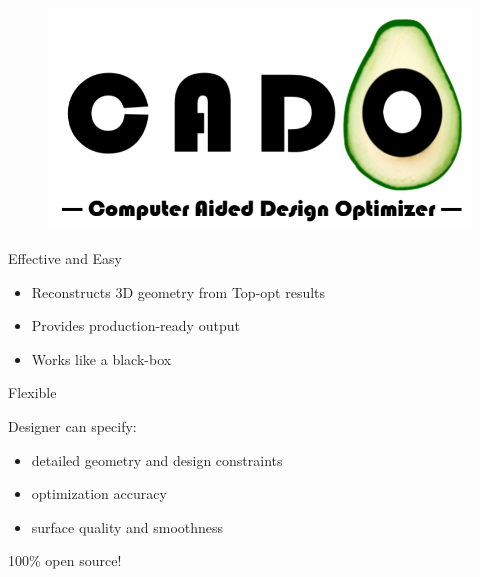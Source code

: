 \begin{frame}
\begin{figure}
\centering
\includegraphics[scale=0.2]{Pictures/FirstHalf/Intro_slide.pdf}
\end{figure}
	\begin{block}{Effective and Easy}{
			\begin{itemize}
				\item Reconstructs 3D geometry from Top-opt results
				\item Provides production-ready output
				\item Works like a black-box
			\end{itemize}
		}
	\end{block}
	\pause
	\begin{block}{Flexible}{
			Designer can specify:
			\begin{itemize}
				\item detailed geometry and design constraints
				\item optimization accuracy
				\item surface quality and smoothness
			\end{itemize}
		}
	\end{block}
	\pause
	\begin{block}{100\% open source!}{
		}
	\end{block}
\end{frame}

